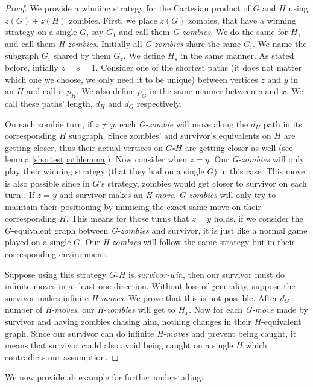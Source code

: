 \documentclass[1p]{elsarticle}
\begin{document}
\begin{proof}
	We provide a winning strategy for the Cartesian product of $G$ and $H$ using $z(G)+z(H)$ zombies. First, we place
	$z(G)$ zombies, that have a winning strategy on a single $G$, say $G_{1}$ and call them {\it G-zombies}. We do the
	same for $H_{1}$ and call them {\it H-zombies}. Initially all {\it G-zombies} share the same $G_{i}$. We name the
	subgraph $G_{i}$ shared by them $G_{z}$. We define $H_{s}$ in the same manner. As stated before, intially $z=s=1$.
	Consider one of the shortest paths (it does not matter which one we choose, we only need it to be unique) between
	vertices $z$ and $y$ in an $H$ and call it $p_H$. We also define $p_G$  in the same manner between $s$ and $x$. We
	call these paths' length, $d_H$ and $d_G$ respectively. 


	On each zombie turn, if $z \neq y$, each {\it G-zombie} will move along the $d_H$ path in its corresponding $H$
	subgraph. Since zombies' and survivor's equivalents on $H$ are getting closer, thus their actual vertices on $G
	\square H$ are getting closer as well (see lemma \ref{shortestpathlemma}).  Now consider when $z = y$. Our {\it
	G-zombies} will only play their winning strategy (that they had on a single $G$) in this case. This move is also
	possible since in $G$'s strategy, zombies would get closer to survivor on each turn . If $z = y$ and survivor makes
	an {\it H-move}, {\it G-zombies} will only try to maintain their positioning by mimicing the exact same move on
	their corresponding $H$. This means for those turns that $z=y$ holds, if we consider the $G$-equivalent graph
	between {\it G-zombies} and survivor, it is just like a normal game played on a single $G$. Our {\it H-zombies} will
	follow the same strategy but in their corresponding environment.
	
	
	Suppose using this strategy $G \square H$ is {\it survivor-win}, then our survivor must do infinite moves in at
	least one direction. Without loss of generality, suppose the survivor makes infinite {\it H-moves}. We prove that
	this is not possible. After $d_G$ number of {\it H-moves}, our {\it H-zombies} will get to $H_x$. Now for each {\it
	G-move} made by survivor and having zombies chasing him, nothing changes in their $H$-equivalent graph. Since our
	survivor can do infinite {\it H-moves} and prevent being caught, it means that survivor could also avoid being
	caught on a single $H$ which contradicts our assumption.
	
\end{proof}
We now provide ab example for further understading:
\end{document}
